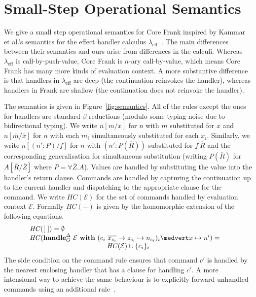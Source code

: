 \documentclass[12pt]{article}
\makeatletter
\newcommand{\lameff}{$\lambda_{\text{eff}}$\xspace}
\newcommand{\lameffrow}{$\lambda_{\text{eff}}^\rho$\xspace}
\newcommand{\EC}{\mathcal{E}}
\newcommand{\many}{\overline}
\newcommand\ba{\begin{array}}
\newcommand\ea{\end{array}}
\newcommand{\bl}{\ba[t]{@{}l@{}}}
\newcommand{\el}{\ea}
\newcommand{\key}[1]{\textbf{#1}} %
\newcommand{\var}{\mathit}        %
\newcommand{\handleSymbol}{\rightarrow}
\newcommand{\handle}[2]{{#1} \handleSymbol {#2}}
\newcommand{\adj}{\Delta}
\makeatother
\begin{document}
\section{Small-Step Operational Semantics}
\label{sec:semantics}

We give a small step operational semantics for Core Frank inspired by
Kammar et al.'s semantics for the effect handler calculus
\lameff~\cite{KammarLO13}.
%
The main differences between their semantics and ours arise from
differences in the calculi. Whereas \lameff is call-by-push-value,
Core Frank is $n$-ary call-by-value, which means Core Frank has many
more kinds of evaluation context.
%
A more substantive difference is that handlers in \lameff are deep
(the continuation reinvokes the handler), whereas handlers in Frank
are shallow (the continuation does not reinvoke the handler).
%

The semantics is given in Figure~\ref{fig:semantics}.  All of the
rules except the ones for handlers are standard $\beta$-reductions
(modulo some typing noise due to bidirectional typing).
%
We write $n[m / x]$ for $n$ with $m$ substituted for $x$ and
$n[\many{m} / \many{x}]$ for $n$ with each $m_i$ simultaneously
substituted for each $x_i$.
%
Similarly, we write $n[(n' : P)/f]$ for $n$ with $(n' : P(\many{R}))$
substituted for $f~\many{R}$ and the corresponding generalisation for
simultaneous substitution (writing $P(\many{R})$ for
$A[\many{R}/\many{Z}]$ where $P = \forall \many{Z}.A$).
%
Values are handled by substituting the value into the handler's return
clause. Commands are handled by capturing the continuation up to the
current handler and dispatching to the appropriate clause for the
command. We write $\var{HC}(\EC)$ for the set of commands handled by
evaluation context $\EC$. Formally $\var{HC}(-)$ is given by the
homomorphic extension of the following equations.
%
\[
\bl
\var{HC}([~]) = \emptyset \\
\var{HC}(\key{handle}^\adj_G~ \EC ~\key{with}~
            (\handle{c_i~\many{x_{c_i}}}{z_{c_i}} \mapsto n_{c_i})_i \medvert
            x \mapsto n') =\quad \\
\hfill \var{HC}(\EC) \cup \{c_i\}_i \\
\el
\]
%
The side condition on the command rule ensures that command $c'$ is
handled by the nearest enclosing handler that has a clause for
handling $c'$.
%
A more intensional way to achieve the same behaviour is to explicitly
forward unhandled commands using an additional rule~\cite{KammarLO13}.
\end{document}
